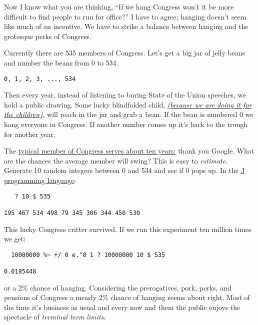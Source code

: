 Now I know what you are thinking, ``If we hang Congress won't it be more
difficult to find people to run for office?'' I have to agree; hanging
doesn't seem like much of an incentive. We have to strike a balance
between hanging and the grotesque perks of Congress.

Currently there are 535 members of Congress. Let's get a big jar of
jelly beans and number the beans from 0 to 534.

\begin{tcolorbox}[breakable, size=fbox, boxrule=1pt, pad at break*=1mm,colback=cellbackground, colframe=cellborder]
\begin{verbatim}
0, 1, 2, 3, ..., 534
\end{verbatim}
\end{tcolorbox}
Then every year, instead of listening to boring State of the Union
speeches, we hold a public drawing. Some lucky blindfolded child,
\emph{\href{http://captaincapitalism.blogspot.com/2009/12/please-stop-it-with-think-of-children.html}{(because
we are doing it for the children),}} will reach in the jar and grab a
bean. If the bean is numbered 0 we hang everyone in Congress. If another
number comes up it's back to the trough for another year.

The
\href{http://docs.google.com/viewer?a=v\&q=cache:P925W\_GMcNwJ:www.senate.gov/reference/resources/pdf/RS22007.pdf+congress+term+average\&hl=en\&gl=us\&pid=bl\&srcid=ADGEESi6G0dwq2fAncmpqw--WUWGaARLZ2-1yYqExeYvjf\_P7ByhvGUlDSKP\_3sbbXFiMfjp6drsojRfNfILIRBkIl1L7ghstd6yoUirPblHoXFco1Q7gFEbNMKtQa55-cEjaT-MkuDi\&sig=AHIEtbSGxJ45QmhPawXiT2TOiB7zpp5u2A}{typical
member of Congress serves about ten years:} thank you Google. What are
the chances the average member will swing? This is easy to \emph{estimate}.
Generate 10 random integers between 0 and 534 and see if 0 pops up. In
the \href{http://www.jsoftware.com/}{J programming language}:

\begin{tcolorbox}[breakable, size=fbox, boxrule=1pt, pad at break*=1mm,colback=cellbackground, colframe=cellborder]
\begin{verbatim}
   ? 10 $ 535
   
195 467 514 498 79 345 306 344 450 530
\end{verbatim}
\end{tcolorbox}
This lucky Congress critter survived. If we run this experiment ten
million times we get:

\begin{tcolorbox}[breakable, size=fbox, boxrule=1pt, pad at break*=1mm,colback=cellbackground, colframe=cellborder]
\begin{verbatim}
  10000000 %~ +/ 0 e."0 1 ? 10000000 10 $ 535
  
0.0185448
\end{verbatim}
\end{tcolorbox}
or a 2\% chance of hanging. Considering the prerogatives, pork, perks,
and pensions of Congress a measly 2\% chance of hanging seems about
right. Most of the time it's business as usual and every now and them
the public enjoys the spectacle of \emph{terminal term limits.}



%
